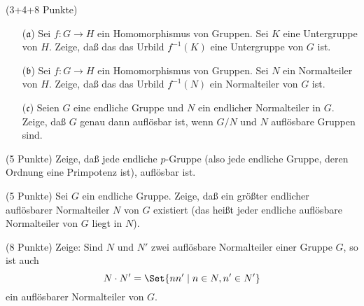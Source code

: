 \documentclass{algsheet}
\begin{document}
\begin{exercise}(3+4+8 Punkte)\vspace{-1ex}
\begin{itemize}
  \item [($\mathfrak a$)]
    Sei \(f\colon G \to H\) ein Homomorphismus von Gruppen. Sei \(K\) eine
    Untergruppe von \(H\). Zeige, daß das das Urbild \(f^{-1}(K)\) eine Untergruppe
    von \(G\) ist.
\item [($\mathfrak b$)]     Sei \(f\colon G \to H\) ein Homomorphismus von Gruppen. Sei \(N\) ein
    Normalteiler von \(H\). Zeige, daß das das Urbild \(f^{-1}(N)\) ein
    Normalteiler von \(G\) ist.
\item [($\mathfrak c$)]     Seien \(G\) eine endliche Gruppe und \(N\) ein endlicher
    Normalteiler in \(G\). Zeige, daß \(G\) genau dann auflösbar ist, wenn
    \(G/N\) und \(N\) auflösbare Gruppen sind.
\end{itemize}
\end{exercise}



\begin{exercise}(5 Punkte)\newline
    Zeige, daß jede endliche \(p\)-Gruppe (also jede endliche Gruppe, deren
    Ordnung eine Primpotenz ist), auflösbar ist.
\end{exercise}

\begin{exercise}(5 Punkte)\newline
    Sei \(G\) ein endliche Gruppe. Zeige, daß ein größter endlicher auflösbarer
    Normalteiler \(N\) von \(G\) existiert (das heißt jeder endliche auflösbare
    Normalteiler von \(G\) liegt in \(N\)).
\end{exercise}

\begin{exercise}(8 Punkte)\newline
    Zeige: Sind \(N\) und \(N'\) zwei auflösbare Normalteiler einer Gruppe \(G\),
    so ist auch \[N \cdot N' = \Set{n n' \mid n \in N, n' \in N'}\] ein auflösbarer
    Normalteiler von \(G\).
\end{exercise}



	
\end{document}
